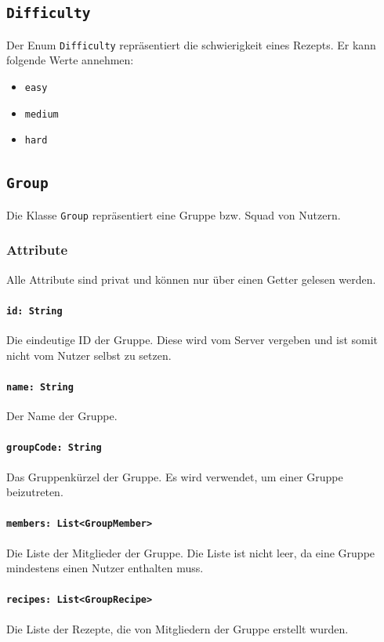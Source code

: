 \documentclass{entwurfsheft}
\begin{document}
\begin{sloppypar}
\newpage
\subsection{\texttt{Difficulty}}
\label{sec:difficulty}
Der Enum \texttt{Difficulty} repräsentiert die \Gls{schwierigkeit} eines Rezepts. Er kann folgende Werte annehmen:
\begin{itemize}
    \item \texttt{easy}
    \item \texttt{medium}
    \item \texttt{hard}
\end{itemize}
\newpage

\subsection{\texttt{Group}}
\label{sec:group}
Die Klasse \texttt{Group} repräsentiert eine Gruppe bzw. Squad von Nutzern.
\subsubsection*{Attribute}
Alle Attribute sind privat und können nur über einen Getter gelesen werden.
\paragraph{\texttt{id: String}}
Die eindeutige ID der Gruppe. Diese wird vom Server vergeben und ist somit nicht vom Nutzer selbst zu setzen.
\paragraph{\texttt{name: String}}
Der Name der Gruppe.
\paragraph{\texttt{groupCode: String}}
Das Gruppenkürzel der Gruppe. Es wird verwendet, um einer Gruppe beizutreten.
\paragraph{\texttt{members: List<GroupMember>}}
Die Liste der Mitglieder der Gruppe. Die Liste ist nicht leer, da eine Gruppe mindestens einen Nutzer enthalten muss.
\paragraph{\texttt{recipes: List<GroupRecipe>}}
Die Liste der Rezepte, die von Mitgliedern der Gruppe erstellt wurden.


\end{sloppypar}
\end{document}
